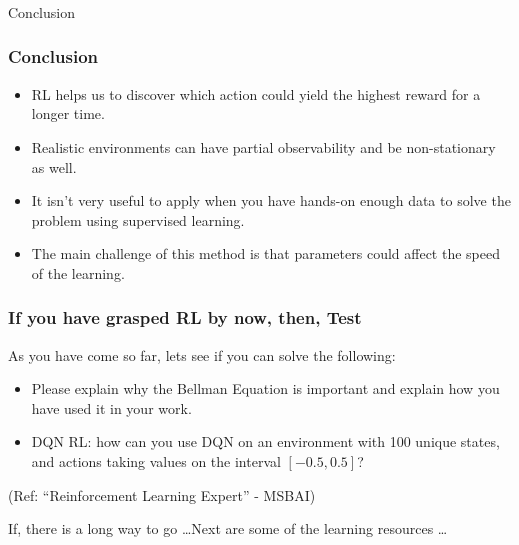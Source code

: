 \begin{frame}[fragile]\frametitle{}
\begin{center}
{\Large Conclusion}
\end{center}
\end{frame}

\begin{frame}[fragile]\frametitle{Conclusion}

\begin{itemize}
\item RL helps us to discover which action could yield the highest reward for a longer time. 
\item Realistic environments can have partial observability and be non-stationary as well. 
\item It isn't very useful to apply when you have hands-on enough data to solve the problem using supervised learning. \item The main challenge of this method is that parameters could affect the speed of the learning.
\end{itemize}
\end{frame}
\begin{frame}\frametitle{If you have grasped RL by now, then, Test}
As you have come so far, lets see if you can solve the following:

\begin{itemize}
\item Please explain why the Bellman Equation is important and explain how you have used it in your work.
\item DQN RL: how can you use DQN on an environment with 100 unique states, and actions taking values on the interval $[-0.5, 0.5]$?
\end{itemize}

{\tiny (Ref: ``Reinforcement Learning Expert'' - MSBAI)}

If, there is a long way to go \ldots  Next are some of the learning resources \ldots
\end{frame}

